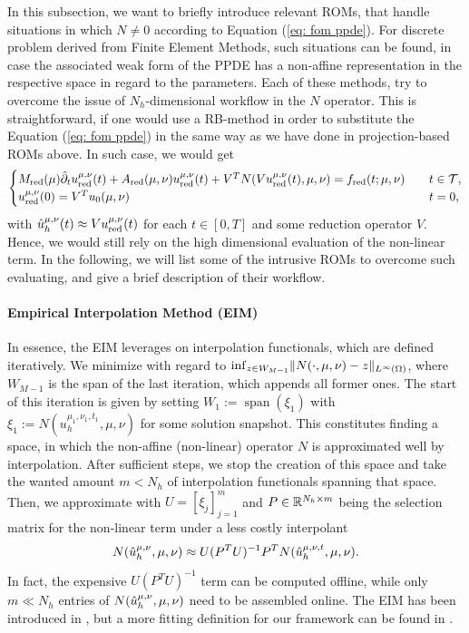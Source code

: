 In this subsection, we want to briefly introduce relevant ROMs, that handle situations in which $N \neq 0$
according to Equation (\ref{eq: fom ppde}). For discrete problem derived from Finite Element Methods, 
such situations can be found, in case
the associated weak form of the PPDE has a non-affine representation in the respective space in regard
to the parameters. Each of these methods, try to overcome the issue of $N_h$-dimensional workflow in 
the $N$ operator. This is straightforward, if one would use a RB-method in order to substitute
the Equation (\ref{eq: fom ppde}) in the same way as we have done in projection-based ROMs above.
In such case, we would get
\begin{equation*}
    \begin{cases}
        M_\text{red}(\mu) \hat{\partial}_t u_\text{red}^{\mu, \nu}(t) + A_\text{red}(\mu, \nu) u_\text{red}^{\mu, \nu}(t)
        + V^T N(V u_\text{red}^{\mu, \nu}(t), \mu, \nu)= f_\text{red}(t; \mu, \nu) \quad &t \in \mathcal{T}, \\
        u_\text{red}^{\mu, \nu}(0) = V^T u_0(\mu, \nu) \quad &t = 0,
    \end{cases}
\end{equation*}
with $\hat{u}_h^{\mu, \nu}(t) \approx V u_\text{red}^{\mu, \nu}(t)$ for each $t \in [0, T]$ and some reduction operator
$V$. Hence, we would still rely on 
the high dimensional evaluation of the non-linear term.
In the following, we will list some of the intrusive ROMs to overcome such evaluating, and
give a brief description of their workflow.

\paragraph{Empirical Interpolation Method (EIM)}

In essence, the EIM leverages on interpolation functionals, which are defined iteratively.
We minimize with regard to $\inf_{z \in W_{M-1}} \lVert N(\cdot, \mu, \nu) - z \rVert_{L^\infty(\Omega)}$,
where $W_{M-1}$ is the span of the last iteration, which appends all former ones. The start
of this iteration is given by setting $W_1 := \operatorname{span}(\xi_1)$ with $\xi_1 := 
N(u_h^{\mu_1, \nu_1, t_1}, \mu, \nu)$ for some solution snapshot.
This constitutes finding a space, in which the non-affine (non-linear) operator $N$ is approximated well
by interpolation. After sufficient steps, we stop the creation of this space and take the wanted
amount $m < N_h$ of interpolation functionals spanning that space. 
Then, we approximate with $U = [\xi_j]_{j=1}^m$ and $P \in \mathbb{R}^{N_h \times m}$ being the selection matrix for the
non-linear term under a less costly interpolant
\begin{equation*}
    N(\hat{u}_h^{\mu, \nu}, \mu, \nu) \approx U (P^T U)^{-1} P^T N(\hat{u}_h^{\mu, \nu, t}, \mu, \nu).
\end{equation*}
In fact, the expensive $U (P^T U)^{-1}$ term can be computed offline, 
while only $m \ll N_h$ entries of $N(\hat{u}_h^{\mu, \nu}, \mu, \nu)$ need to be assembled online. The EIM has been
introduced in \cite{barrault2004}, but a more fitting definition for our framework can be found
in \cite{quarteroni2015rb}.

